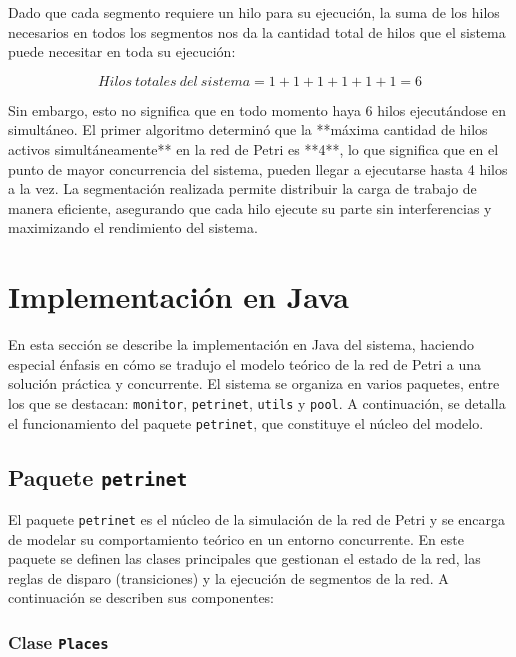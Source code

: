 \documentclass[12pt]{article}
\begin{document}
Dado que cada segmento requiere un hilo para su ejecución, la suma de los hilos necesarios en todos los segmentos nos da la cantidad total de hilos que el sistema puede necesitar en toda su ejecución:

\[
Hilos\ totales\ del\ sistema = 1 + 1 + 1 + 1 + 1 + 1 = 6
\]

Sin embargo, esto no significa que en todo momento haya 6 hilos ejecutándose en simultáneo.  
El primer algoritmo determinó que la **máxima cantidad de hilos activos simultáneamente** en la red de Petri es **4**, lo que significa que en el punto de mayor concurrencia del sistema, pueden llegar a ejecutarse hasta 4 hilos a la vez.  
La segmentación realizada permite distribuir la carga de trabajo de manera eficiente, asegurando que cada hilo ejecute su parte sin interferencias y maximizando el rendimiento del sistema.

\section{Implementación en Java}

En esta sección se describe la implementación en Java del sistema, haciendo especial énfasis en cómo se tradujo el modelo teórico de la red de Petri a una solución práctica y concurrente. El sistema se organiza en varios paquetes, entre los que se destacan: \texttt{monitor}, \texttt{petrinet}, \texttt{utils} y \texttt{pool}. A continuación, se detalla el funcionamiento del paquete \texttt{petrinet}, que constituye el núcleo del modelo.

\subsection{Paquete \texttt{petrinet}}

El paquete \texttt{petrinet} es el núcleo de la simulación de la red de Petri y se encarga de modelar su comportamiento teórico en un entorno concurrente. En este paquete se definen las clases principales que gestionan el estado de la red, las reglas de disparo (transiciones) y la ejecución de segmentos de la red. A continuación se describen sus componentes:

\subsubsection{Clase \texttt{Places}}
\end{document}
